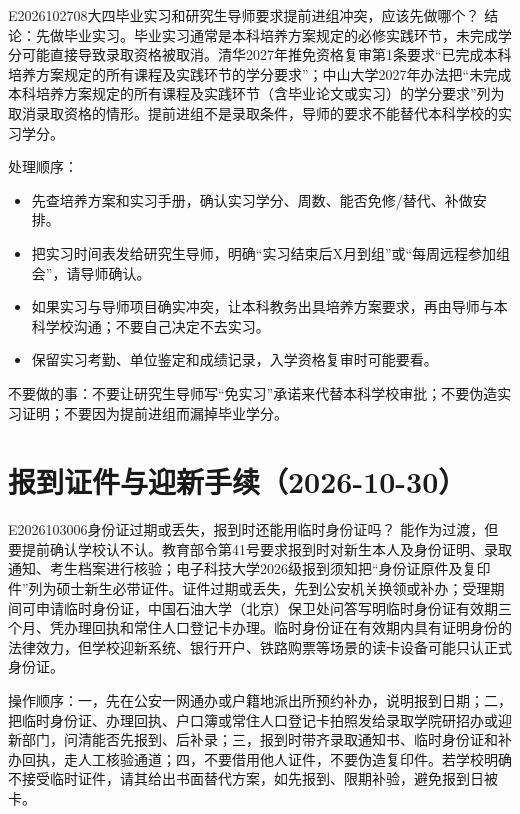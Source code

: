 \begin{qa}{E2026102708}{大四毕业实习和研究生导师要求提前进组冲突，应该先做哪个？}
结论：先做毕业实习。毕业实习通常是本科培养方案规定的必修实践环节，未完成学分可能直接导致录取资格被取消。清华2027年推免资格复审第1条要求“已完成本科培养方案规定的所有课程及实践环节的学分要求”；中山大学2027年办法把“未完成本科培养方案规定的所有课程及实践环节（含毕业论文或实习）的学分要求”列为取消录取资格的情形。提前进组不是录取条件，导师的要求不能替代本科学校的实习学分。

处理顺序：
\begin{itemize}
  \item 先查培养方案和实习手册，确认实习学分、周数、能否免修/替代、补做安排。
  \item 把实习时间表发给研究生导师，明确“实习结束后X月到组”或“每周远程参加组会”，请导师确认。
  \item 如果实习与导师项目确实冲突，让本科教务出具培养方案要求，再由导师与本科学校沟通；不要自己决定不去实习。
  \item 保留实习考勤、单位鉴定和成绩记录，入学资格复审时可能要看。
\end{itemize}

不要做的事：不要让研究生导师写“免实习”承诺来代替本科学校审批；不要伪造实习证明；不要因为提前进组而漏掉毕业学分。
\end{qa}

\section{报到证件与迎新手续（2026-10-30）}

\begin{qa}{E2026103006}{身份证过期或丢失，报到时还能用临时身份证吗？}
能作为过渡，但要提前确认学校认不认。教育部令第41号要求报到时对新生本人及身份证明、录取通知、考生档案进行核验；电子科技大学2026级报到须知把“身份证原件及复印件”列为硕士新生必带证件。证件过期或丢失，先到公安机关换领或补办；受理期间可申请临时身份证，中国石油大学（北京）保卫处问答写明临时身份证有效期三个月、凭办理回执和常住人口登记卡办理。临时身份证在有效期内具有证明身份的法律效力，但学校迎新系统、银行开户、铁路购票等场景的读卡设备可能只认正式身份证。

操作顺序：一，先在公安一网通办或户籍地派出所预约补办，说明报到日期；二，把临时身份证、办理回执、户口簿或常住人口登记卡拍照发给录取学院研招办或迎新部门，问清能否先报到、后补录；三，报到时带齐录取通知书、临时身份证和补办回执，走人工核验通道；四，不要借用他人证件，不要伪造复印件。若学校明确不接受临时证件，请其给出书面替代方案，如先报到、限期补验，避免报到日被卡。
\end{qa}


